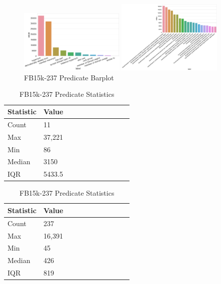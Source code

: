 
\begin{figure}[H]
	\parbox{.5\linewidth}{
   		\caption{WN18RR Predicate Barplot}
   		\centering
    		\includegraphics[width=0.45\textwidth, height=0.2\textheight]{WN18RR_Predicate_Counts}
		}
	\hfill
	\parbox{.5\linewidth}{
		\caption{FB15k-237 Predicate Barplot}
   		\centering
		\includegraphics[width=0.45\textwidth, height=0.2\textheight]{FB15k-237_Predicate_Counts}
		}
\end{figure}

\begin{table}[H]
	\parbox{.5\linewidth}{
		\caption{WN18RR Predicate Statistics}
		\centering
		\begin{tabular}{lllllllllll}
  			\textbf{Statistic} & \textbf{Value}  \\
  			\hline
			Count & 11 \\
			Max & 37,221  \\
			Min & 86 \\
  			Median & 3150  \\
  			IQR & 5433.5  \\
		\end{tabular}
		}
	\hfill
	\parbox{.5\linewidth}{
		\caption{FB15k-237 Predicate Statistics}
		\centering
		\begin{tabular}{lllllllllll}
  			\textbf{Statistic} & \textbf{Value}  \\
  			\hline
			Count & 237 \\
			Max & 16,391 \\
			Min & 45  \\
  			Median & 426  \\
  			IQR & 819 \\
		\end{tabular}
		}
\end{table}

